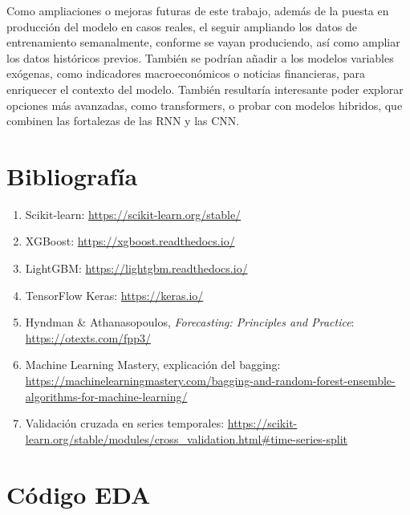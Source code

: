 \documentclass[a4paper,onecolumn]{extarticle}
\let\stdsection\section
\renewcommand\section{\newpage\stdsection}
\begin{document}
\begin{sloppypar}
Como ampliaciones o mejoras futuras de este trabajo, además de la puesta en producción del modelo en casos reales, el seguir ampliando los datos de entrenamiento semanalmente, conforme se vayan produciendo,
así como ampliar los datos históricos previos. También se podrían añadir a los modelos variables exógenas, como indicadores macroeconómicos o noticias financieras, para enriquecer el contexto del modelo.
También resultaría interesante poder explorar opciones más avanzadas, como transformers, o probar con modelos hibridos, que combinen las fortalezas de las RNN y las CNN.

\renewcommand\section{\stdsection}
\section{Bibliografía} \label{bibliografia}
\begin{enumerate}
    \item Scikit-learn: \url{https://scikit-learn.org/stable/}
    \item XGBoost: \url{https://xgboost.readthedocs.io/}
    \item LightGBM: \url{https://lightgbm.readthedocs.io/}
    \item TensorFlow Keras: \url{https://keras.io/}
    \item Hyndman \& Athanasopoulos, \textit{Forecasting: Principles and Practice}: \url{https://otexts.com/fpp3/}
    \item Machine Learning Mastery, explicación del bagging: \url{https://machinelearningmastery.com/bagging-and-random-forest-ensemble-algorithms-for-machine-learning/}
    \item Validación cruzada en series temporales: \url{https://scikit-learn.org/stable/modules/cross_validation.html#time-series-split}
\end{enumerate}

\renewcommand\section{\newpage\stdsection}

\clearpage

\appendix
\section{Código EDA}\label{Anexo:EDA}



\end{sloppypar}
\end{document}
